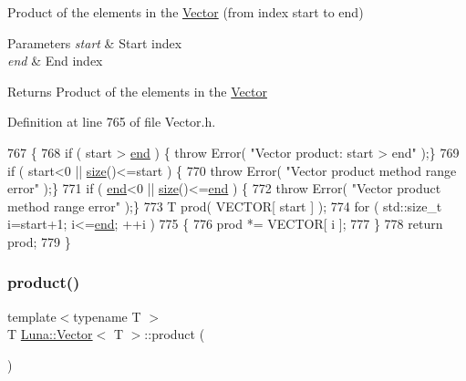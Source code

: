 Product of the elements in the \hyperlink{classLuna_1_1Vector}{Vector} (from index start to end) 


\begin{DoxyParams}{Parameters}
{\em start} & Start index \\
\hline
{\em end} & End index \\
\hline
\end{DoxyParams}
\begin{DoxyReturn}{Returns}
Product of the elements in the \hyperlink{classLuna_1_1Vector}{Vector} 
\end{DoxyReturn}


Definition at line 765 of file Vector.\+h.


\begin{DoxyCode}
767   \{
768     \textcolor{keywordflow}{if} ( start > \hyperlink{classLuna_1_1Vector_a94f0c4fd25cb841b21d7bf7be4d6004f}{end} )   \{ \textcolor{keywordflow}{throw} Error( \textcolor{stringliteral}{"Vector product: start > end"} );\}
769     \textcolor{keywordflow}{if} ( start<0 || \hyperlink{classLuna_1_1Vector_ac9b6ed7a0df401728f27c193fbc8f4d8}{size}()<=start ) \{
770       \textcolor{keywordflow}{throw} Error( \textcolor{stringliteral}{"Vector product method range error"} );\}
771     \textcolor{keywordflow}{if} ( \hyperlink{classLuna_1_1Vector_a94f0c4fd25cb841b21d7bf7be4d6004f}{end}<0 || \hyperlink{classLuna_1_1Vector_ac9b6ed7a0df401728f27c193fbc8f4d8}{size}()<=\hyperlink{classLuna_1_1Vector_a94f0c4fd25cb841b21d7bf7be4d6004f}{end} )   \{
772       \textcolor{keywordflow}{throw} Error( \textcolor{stringliteral}{"Vector product method range error"} );\}
773     T prod( VECTOR[ start ] );
774     \textcolor{keywordflow}{for} ( std::size\_t i=start+1; i<=\hyperlink{classLuna_1_1Vector_a94f0c4fd25cb841b21d7bf7be4d6004f}{end}; ++i )
775     \{
776       prod *= VECTOR[ i ];
777     \}
778     \textcolor{keywordflow}{return} prod;
779   \}
\end{DoxyCode}
\mbox{\label{classLuna_1_1Vector_ac5b4435a746e0894b8b4caa893b53619}} 
\subsubsection{\texorpdfstring{product()}{product()}\hspace{0.1cm}{\footnotesize\ttfamily [2/2]}}
{\footnotesize\ttfamily template$<$typename T $>$ \\
T \hyperlink{classLuna_1_1Vector}{Luna\+::\+Vector}$<$ T $>$\+::product (\begin{DoxyParamCaption}{ }\end{DoxyParamCaption})\hspace{0.3cm}{\ttfamily [inline]}}


